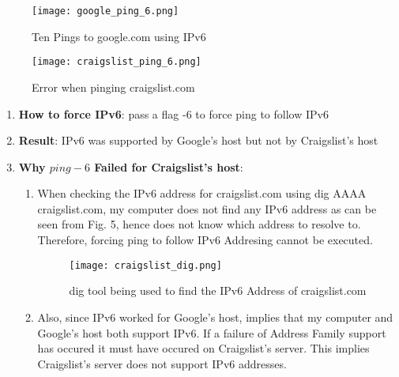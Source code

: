 \documentclass[12pt]{article}
\begin{document}
\begin{enumerate}
    \begin{figure}[h!]
        \centering
        \texttt{[image: google\_ping\_6.png]}
        \caption{Ten Pings to google.com using IPv6}
    \end{figure}
    \begin{figure}[h!]
        \centering
        \texttt{[image: craigslist\_ping\_6.png]}
        \caption{Error when pinging craigslist.com}
    \end{figure}
    \begin{enumerate}
        \item \textbf{How to force IPv6}: pass a flag -6 to force ping to follow IPv6
        \item \textbf{Result}: IPv6 was supported by Google's host but not by Craigslist's host
        \item \textbf{Why $ping -6$ Failed for Craigslist's host}: 
        \begin{enumerate}
            \item When checking the IPv6 address for craigslist.com using dig AAAA craigslist.com, my computer does not find any IPv6 address as can be seen from Fig. 5, hence does not know which address to resolve to. Therefore, forcing ping to follow IPv6 Addresing cannot be executed.
            \begin{figure}[h!]
                \centering
                \texttt{[image: craigslist\_dig.png]}
                \caption{dig tool being used to find the IPv6 Address of craigslist.com}
            \end{figure}        
            \item Also, since IPv6 worked for Google's host, implies that my computer and Google's host both support IPv6. If a failure of Address Family support has occured it must have occured on Craigslist's server. This implies Craigslist's server does not support IPv6 addresses.
        \end{enumerate}
    \end{enumerate}
    

\end{enumerate}
\end{document}
